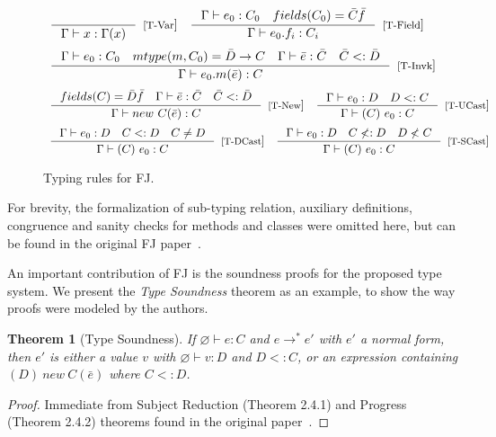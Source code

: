 \documentclass[tese,capa,english]{texufpel}
\newtheorem{theorem}{Theorem}
\begin{document}
\begin{figure}[!htb]
\[
\begin{array}{cc} 
\inference{}
          {\Gamma \vdash x : \Gamma(x)}[[T-Var]]
&
\inference{\Gamma \vdash e_0 : C_0 \ \ \ fields(C_0) = \bar{C} \bar{f}}
          {\Gamma \vdash e_0.f_i : C_i}[[T-Field]]
\end{array}
\]
\[
\begin{array}{c} 
\inference{\Gamma \vdash e_0 : C_0 \ \ \ mtype(m, C_0) = \bar{D} -> C \ \ \  \Gamma \vdash \bar{e} : \bar{C} \ \ \ \bar{C} <: \bar{D}}
          {\Gamma \vdash e_0.m(\bar{e}) : C}[[T-Invk]]
\end{array}
\] 
\[
\begin{array}{cc} 
\inference{fields(C) = \bar{D} \bar{f} \ \ \ \Gamma \vdash \bar{e} : \bar{C} \ \ \ \bar{C} <: \bar{D}}
          {\Gamma \vdash new ~ C(\bar{e}) : C}[[T-New]]
&
\inference{\Gamma \vdash e_0 : D \ \ \ D <: C}
          {\Gamma \vdash (C) ~ e_0 : C}[[T-UCast]]
\end{array}
\]
\[
\begin{array}{cc}
\inference{\Gamma \vdash e_0 : D \ \ \ C <: D \ \ \ C \ne D}
{\Gamma \vdash (C) ~ e_0 : C}[[T-DCast]]
&
\inference{\Gamma \vdash e_0 : D \ \ \ C \nless: D \ \ \ D \nless C}
{\Gamma \vdash (C) ~ e_0 : C}[[T-SCast]]
\end{array}
\]
\caption{Typing rules for FJ.}
\label{fig:fj-types}
\end{figure}

For brevity, the formalization of sub-typing relation, auxiliary definitions, congruence and sanity checks for methods and classes were omitted here, but can be found in the original FJ paper~\cite{Igarashi:2001:FJM:503502.503505}. 

An important contribution of FJ is the soundness proofs for the proposed type system. We present the \emph{Type Soundness} theorem as an example, to show the way proofs were modeled by the authors.

\begin{theorem}[Type Soundness] If $\varnothing \vdash e : C$ and $e \rightarrow^{*} e'$ with $e'$ a normal form, then $e'$ is either a value $v$ with $\varnothing \vdash v: D$ and $D <: C$, or an expression containing $(D) ~ new ~ C(\bar{e})$ where $C <: D$.
\end{theorem}

\begin{proof}
Immediate from Subject Reduction (Theorem 2.4.1) and Progress (Theorem 2.4.2) theorems found in the original paper~\cite{Igarashi:2001:FJM:503502.503505}.
\end{proof}
\end{document}
